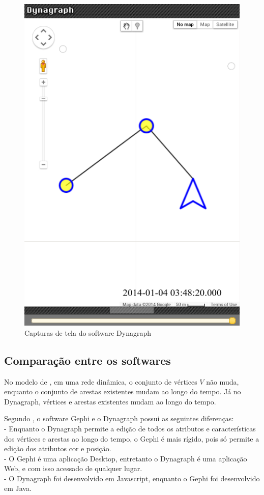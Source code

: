 \begin{figure}[htbp]
 \includegraphics[width=.45\textwidth]{chapters/fig/b4.png}
\caption{Capturas de tela do software Dynagraph}
\label{fig:dynagraph}
\end{figure}

\FloatBarrier

\subsection{Comparação entre os softwares}
No modelo de \cite{kim}, em uma rede dinâmica, o conjunto de vértices $V$ não muda, enquanto o conjunto de arestas existentes
mudam ao longo do tempo. Já no Dynagraph, vértices e arestas existentes mudam ao longo do tempo.

Segundo \cite{dynagraph}, o software Gephi e o Dynagraph possui as seguintes diferenças:\\
- Enquanto o Dynagraph permite a edição de todos os atributos e características dos vértices e arestas ao longo do tempo, o Gephi
é mais rígido, pois só permite a edição dos atributos cor e posição.\\
- O Gephi é uma aplicação Desktop, entretanto o Dynagraph é uma aplicação Web, e com isso acessado de qualquer lugar.\\
- O Dynagraph foi desenvolvido em Javascript, enquanto o Gephi foi desenvolvido em Java.














